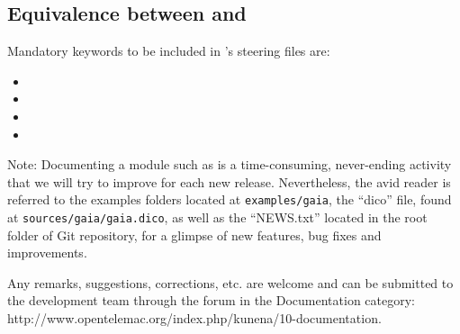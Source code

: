\subsection{Equivalence between \gaia{} and \sisyphe{}}
Mandatory keywords to be included in \gaia{}'s steering files are:
\begin{itemize}
\item {}
\item {}
\item {}
\item {}
\end{itemize}


\begin{WarningBlock}{Note:}
  Documenting a module such as \gaia{} is a time-consuming, never-ending
  activity that we will try to improve for each new release. Nevertheless,
  the avid reader is referred to the examples folders located at
  \texttt{examples/gaia}, the ``dico'' file, found at
  \texttt{sources/gaia/gaia.dico}, as well as the ``NEWS.txt'' located in
  the root folder of \telemacsystem Git repository, for a glimpse of new
  features, bug fixes and improvements.

  Any remarks, suggestions, corrections, etc. are welcome and can be submitted
  to the \telemacsystem development team through the forum in the Documentation
  category: http://www.opentelemac.org/index.php/kunena/10-documentation.
\end{WarningBlock}

